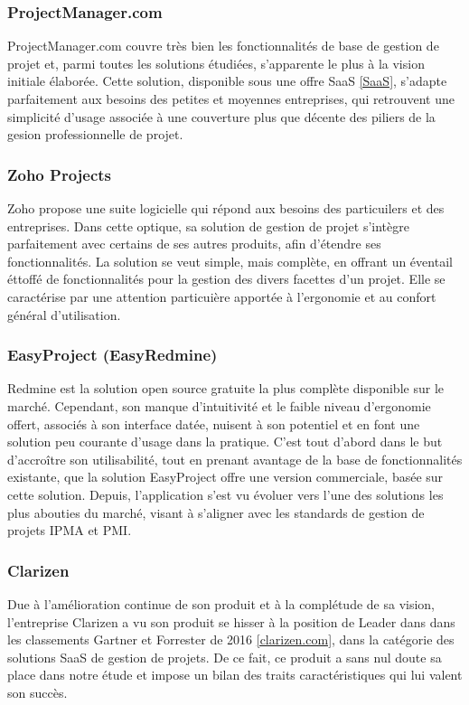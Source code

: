 \begin{spacing}{1.5}
\subsubsection*{ProjectManager.com} %
ProjectManager.com couvre très bien les fonctionnalités de base de gestion de projet et, parmi toutes les solutions étudiées, s'apparente le plus à la vision initiale élaborée. Cette solution, disponible sous une offre SaaS \ref{SaaS}, s'adapte parfaitement aux besoins des petites et moyennes entreprises, qui retrouvent une simplicité d'usage associée à une couverture plus que décente des piliers de la gesion professionnelle de projet.

\subsubsection*{Zoho Projects} %
Zoho propose une suite logicielle qui répond aux besoins des particuilers et des entreprises. Dans cette optique, sa solution de gestion de projet s'intègre parfaitement avec certains de ses autres produits, afin d'étendre ses fonctionnalités. La solution se veut simple, mais complète, en offrant un éventail éttoffé de fonctionnalités pour la gestion des divers facettes d'un projet. Elle se caractérise par une attention particuière apportée à l'ergonomie et au confort général d'utilisation.

\subsubsection*{EasyProject (EasyRedmine)} %
Redmine est la solution open source gratuite la plus complète disponible sur le marché. Cependant, son manque d'intuitivité et le faible niveau d'ergonomie offert, associés à son interface datée, nuisent à son potentiel et en font une solution peu courante d'usage dans la pratique. C'est tout d'abord dans le but d'accroître son utilisabilité, tout en prenant avantage de la base de fonctionnalités existante, que la solution EasyProject offre une version commerciale, basée sur cette solution. Depuis, l'application s'est vu évoluer vers l'une des solutions les plus abouties du marché, visant à s'aligner avec les standards de gestion de projets IPMA et PMI.

\subsubsection*{Clarizen} %
Due à l'amélioration continue de son produit et à la complétude de sa vision, l'entreprise Clarizen a vu son produit se hisser à la position de Leader dans dans les classements Gartner et Forrester de 2016 \ref{clarizen.com}, dans la catégorie des solutions SaaS de gestion de projets. De ce fait, ce produit a sans nul doute sa place dans notre étude et impose un bilan des traits caractéristiques qui lui valent son succès.
\\


\end{spacing}
